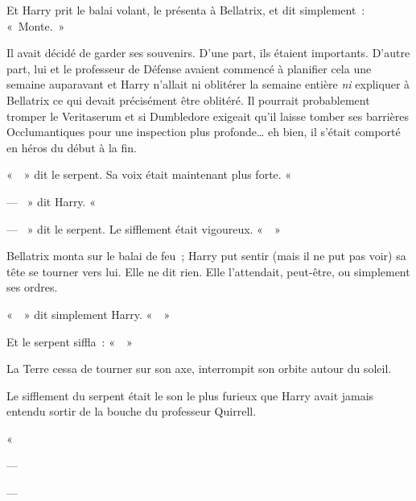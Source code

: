 Et Harry prit le balai volant, le présenta à Bellatrix, et dit simplement~: «~Monte.~»

Il avait décidé de garder ses souvenirs. D'une part, ils étaient importants. D'autre part, lui et le professeur de Défense avaient commencé à planifier cela une semaine auparavant et Harry n'allait ni oblitérer la semaine entière \emph{ni} expliquer à Bellatrix ce qui devait précisément être oblitéré. Il pourrait probablement tromper le Veritaserum et si Dumbledore exigeait qu'il laisse tomber ses barrières Occlumantiques pour une inspection plus profonde… eh bien, il s'était comporté en héros du début à la fin.

«~~» dit le serpent. Sa voix était maintenant plus forte. «~

--- ~» dit Harry. «~

--- ~» dit le serpent. Le sifflement était vigoureux. «~~»

Bellatrix monta sur le balai de feu~; Harry put sentir (mais il ne put pas voir) sa tête se tourner vers lui. Elle ne dit rien. Elle l'attendait, peut-être, ou simplement ses ordres.

«~~» dit simplement Harry. «~~»

Et le serpent siffla~: «~~»

La Terre cessa de tourner sur son axe, interrompit son orbite autour du soleil.

Le sifflement du serpent était le son le plus furieux que Harry avait jamais entendu sortir de la bouche du professeur Quirrell.

«~

--- 

--- 

